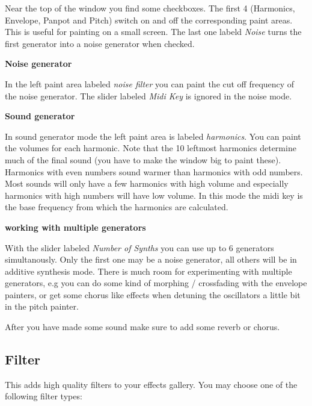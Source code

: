 \documentclass[letterpaper]{report}
\begin{document}
Near the top of the window you find some checkboxes. The first
4 (Harmonics, Envelope, Panpot and Pitch) switch on and off the
corresponding paint areas.  This is useful for painting on a small screen.
The last one labeld {\it Noise} turns the first generator into a noise
generator when checked.

{\bf Noise generator}

In the left paint area labeled {\it noise filter}  you can paint the
cut off frequency of the noise generator. The slider labeled {\it Midi Key}
is ignored in the noise mode.


{\bf Sound generator}

In sound generator mode the left paint area is labeled {\it harmonics}. You can
paint the volumes for each harmonic. Note that the 10 leftmost harmonics
determine much of the final sound (you have to make the window big to
paint these). Harmonics with even numbers sound warmer than harmonics
with odd numbers. Most sounds will only have a few harmonics with
high volume and especially harmonics with high numbers will have low
volume. In this mode the midi key is the base frequency from which the
harmonics are calculated.

{\bf working with multiple generators}

With the slider labeled {\it Number of Synths} you can use up to 6 generators
simultanously. Only the first one may be a noise generator, all others will
be in additive synthesis mode. There is much room for experimenting with
multiple generators, e.g you can do some kind of morphing / crossfading with
the envelope painters, or get some chorus like effects when detuning the
oscillators a little bit in the pitch painter.

After you have made some sound make sure to add some reverb or chorus.



\subsection{Filter}

This adds high quality filters to your effects gallery. You may choose
one of the following filter types:
\end{document}
